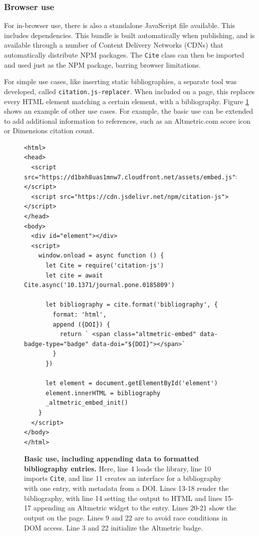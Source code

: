 \documentclass[fleqn,10pt,lineno]{wlpeerj} %
\begin{document}
\subsubsection*{Browser use}

For in-browser use, there is also a standalone JavaScript file available. This includes dependencies. This bundle is built automatically when publishing, and is available through a number of Content Delivery Networks (CDNs) that automatically distribute NPM packages. The \texttt{Cite} class can then be imported and used just as the NPM package, barring browser limitations.

For simple use cases, like inserting static bibliographies, a separate tool was developed, called \texttt{citation.js-replacer}. When included on a page, this replaces every HTML element matching a certain element, with a bibliography. Figure \ref{code:use} shows an example of other use cases. For example, the basic use can be extended to add additional information to references, such as an Altmetric.com score icon or Dimensions citation count.

\begin{figure}[ht]
\centering
\begin{verbatim}
<html>
<head>
  <script src="https://d1bxh8uas1mnw7.cloudfront.net/assets/embed.js"></script>
  <script src="https://cdn.jsdelivr.net/npm/citation-js"></script>
</head>
<body>
  <div id="element"></div>
  <script>
    window.onload = async function () {
      let Cite = require('citation-js')
      let cite = await Cite.async('10.1371/journal.pone.0185809')
      
      let bibliography = cite.format('bibliography', {
        format: 'html',
        append ({DOI}) {
          return ` <span class="altmetric-embed" data-badge-type="badge" data-doi="${DOI}"></span>`
        }
      })
    
      let element = document.getElementById('element')
      element.innerHTML = bibliography
      _altmetric_embed_init()
    }
  </script>
</body>
</html>
\end{verbatim}
\caption{\textbf{Basic use, including appending data to formatted bibliography entries.}
Here, line 4 loads the library, line 10 imports \texttt{Cite}, and line 11 creates an interface for a bibliography with one entry, with metadata from a DOI. Lines 13-18 render the bibliography, with line 14 setting the output to HTML and lines 15-17 appending an Altmetric widget to the entry. Lines 20-21 show the output on the page. Lines 9 and 22 are to avoid race conditions in DOM access. Line 3 and 22 initialize the Altmetric badge.
}
\label{code:use}
\end{figure}
\end{document}
